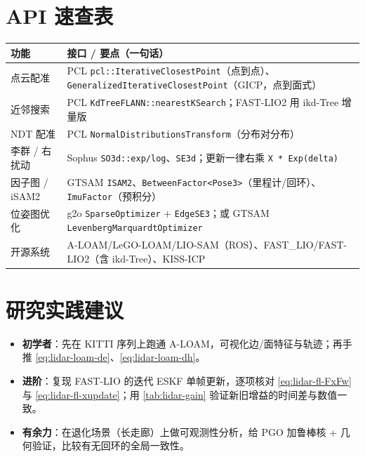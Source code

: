 \section*{API 速查表}
\begin{table}[H]\centering\small
\begin{tabular}{p{} p{}}
\toprule
功能 & 接口 / 要点（一句话） \\
\midrule
点云配准 & PCL \texttt{pcl::IterativeClosestPoint}（点到点）、\texttt{GeneralizedIterativeClosestPoint}（GICP，点到面式） \\
近邻搜索 & PCL \texttt{KdTreeFLANN::nearestKSearch}；FAST-LIO2 用 ikd-Tree 增量版 \\
NDT 配准 & PCL \texttt{NormalDistributionsTransform}（分布对分布） \\
李群 / 右扰动 & Sophus \texttt{SO3d::exp/log}、\texttt{SE3d}；更新一律右乘 \texttt{X * Exp(delta)} \\
因子图 / iSAM2 & GTSAM \texttt{ISAM2}、\texttt{BetweenFactor<Pose3>}（里程计/回环）、\texttt{ImuFactor}（预积分） \\
位姿图优化 & g2o \texttt{SparseOptimizer} + \texttt{EdgeSE3}；或 GTSAM \texttt{LevenbergMarquardtOptimizer} \\
开源系统 & A-LOAM/LeGO-LOAM/LIO-SAM（ROS）、FAST\_LIO/FAST-LIO2（含 ikd-Tree）、KISS-ICP \\
\bottomrule
\end{tabular}
\end{table}

\section*{研究实践建议}
\begin{itemize}
  \item \textbf{初学者}：先在 KITTI 序列上跑通 A-LOAM，可视化边/面特征与轨迹；再手推 \cref{eq:lidar-loam-de}、\cref{eq:lidar-loam-dh}。
  \item \textbf{进阶}：复现 FAST-LIO 的迭代 ESKF 单帧更新，逐项核对 \cref{eq:lidar-fl-FxFw} 与 \cref{eq:lidar-fl-xupdate}；用 \cref{tab:lidar-gain} 验证新旧增益的时间差与数值一致。
  \item \textbf{有余力}：在退化场景（长走廊）上做可观测性分析，给 PGO 加鲁棒核 + 几何验证，比较有无回环的全局一致性。
\end{itemize}
